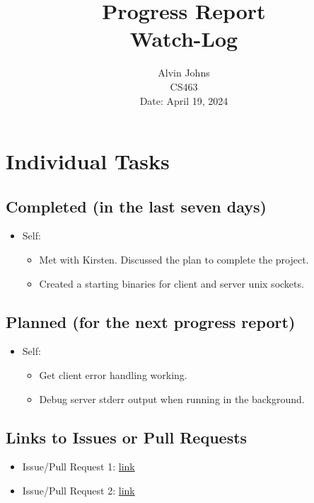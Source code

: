 \documentclass{article}
\title{Progress Report\\[0.5em]
\large Watch-Log}
\author{Alvin Johns\\
CS463\\
Date: April 19, 2024}
\date{}
\begin{document}
\maketitle

\section*{Individual Tasks}
\subsection*{Completed (in the last seven days)}
\begin{itemize}[label={--}]
    \item Self:
        \begin{itemize}[label={}]
            \item Met with Kirsten. Discussed the plan to complete the project. 
            \item Created a starting binaries for client and server unix sockets.
        \end{itemize}
\end{itemize}

\subsection*{Planned (for the next progress report)}
\begin{itemize}[label={--}]
    \item Self:
        \begin{itemize}[label={}]
            \item Get client error handling working. 
            \item Debug server stderr output when running in the background. 
        \end{itemize}
\end{itemize}

\subsection*{Links to Issues or Pull Requests}
\begin{itemize}[label={--}]
    \item Issue/Pull Request 1: \url{link}
    \item Issue/Pull Request 2: \url{link}
\end{itemize}
\end{document}
